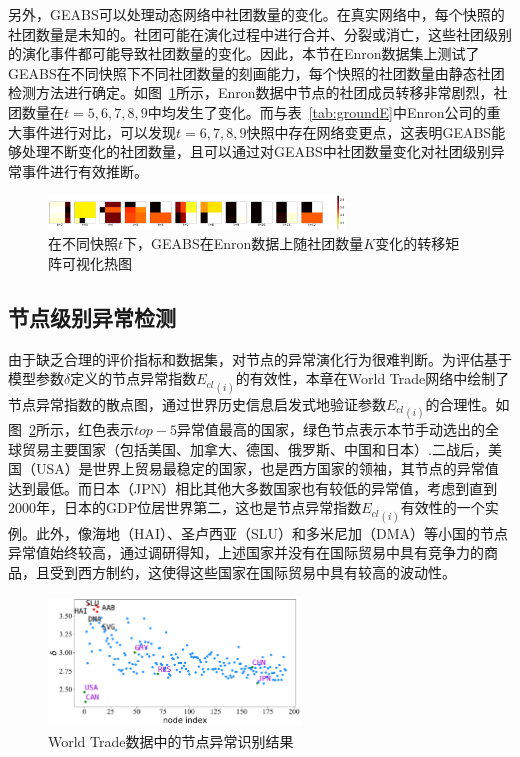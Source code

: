另外，GEABS可以处理动态网络中社团数量的变化。在真实网络中，每个快照的社团数量是未知的。社团可能在演化过程中进行合并、分裂或消亡，这些社团级别的演化事件都可能导致社团数量的变化。因此，本节在Enron数据集上测试了GEABS在不同快照下不同社团数量的刻画能力，每个快照的社团数量由静态社团检测方法进行确定。如图~\ref{fig:enronTransA}所示，Enron数据中节点的社团成员转移非常剧烈，社团数量在$t=5,6,7,8,9$中均发生了变化。而与表~\ref{tab:groundE}中Enron公司的重大事件进行对比，可以发现$t=6,7,8,9$快照中存在网络变更点，这表明GEABS能够处理不断变化的社团数量，且可以通过对GEABS中社团数量变化对社团级别异常事件进行有效推断。
 
 \begin{figure}
 	\centering
 	\includegraphics[width=0.7\textwidth]{figures/chap05/EnronTransA-heatmap.pdf}
 	\caption{在不同快照$t$下，GEABS在Enron数据上随社团数量$K$变化的转移矩阵可视化热图}
 	\label{fig:enronTransA}
 \end{figure}
 
 
\subsection{节点级别异常检测}


由于缺乏合理的评价指标和数据集，对节点的异常演化行为很难判断。为评估基于模型参数$\delta$定义的节点异常指数${E_{cl}}_{(i)}$的有效性，本章在World Trade网络中绘制了节点异常指数的散点图，通过世界历史信息启发式地验证参数${E_{cl}}_{(i)}$的合理性。如图~\ref{fig:worldtradenode}所示，红色表示$top-5$异常值最高的国家，绿色节点表示本节手动选出的全球贸易主要国家（包括美国、加拿大、德国、俄罗斯、中国和日本）.二战后，美国（USA）是世界上贸易最稳定的国家，也是西方国家的领袖，其节点的异常值达到最低。而日本（JPN）相比其他大多数国家也有较低的异常值，考虑到直到$2000$年，日本的GDP位居世界第二，这也是节点异常指数${E_{cl}}_{(i)}$有效性的一个实例。此外，像海地（HAI）、圣卢西亚（SLU）和多米尼加（DMA）等小国的节点异常值始终较高，通过调研得知，上述国家并没有在国际贸易中具有竞争力的商品，且受到西方制约，这使得这些国家在国际贸易中具有较高的波动性。


\begin{figure}
	\centering
	\includegraphics[width=0.6\textwidth]{figures/chap05/worldtradenode-adjusted.pdf}
	\caption{World Trade数据中的节点异常识别结果}
	\label{fig:worldtradenode}
\end{figure}



